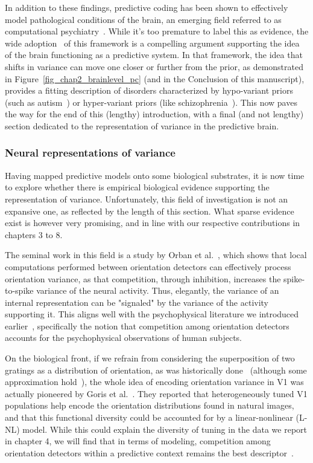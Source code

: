 In addition to these findings, predictive coding has been shown to effectively model pathological conditions of the brain, an emerging field referred to as computational psychiatry~\cite{adams2013computational}.  While it's too premature to label this as evidence, the wide adoption~\cite{grenander1998computational} of this framework is a compelling argument supporting the idea of the brain functioning as a predictive system. In that framework, the idea that shifts in variance can move one closer or further from the prior, as demonstrated in Figure~\ref{fig_chap2_brainlevel_pc} (and in the Conclusion of this manuscript), provides a fitting description of disorders characterized by hypo-variant priors (such as autism~\cite{van2013predictive, van2014precise}) or hyper-variant priors (like schizophrenia~\cite{horga2014deficits}). This now paves the way for the end of this (lengthy) introduction, with a final (and not lengthy) section dedicated to the representation of variance in the predictive brain.

\newpage

\subsubsection{Neural representations of variance}
Having mapped predictive models onto some biological substrates, it is now time to explore whether there is empirical biological evidence supporting the representation of variance. Unfortunately, this field of investigation is not an expansive one, as reflected by the length of this section. What sparse evidence exist is however very promising, and in line with our respective contributions in chapters 3 to 8.

The seminal work in this field is a study by Orban et al.~\cite{orban2016neural}, which shows that local computations performed between orientation detectors can effectively process orientation variance, as that competition, through inhibition, increases the spike-to-spike variance of the neural activity. Thus, elegantly, the variance of an internal representation can be "signaled" by the variance of the activity supporting it. This aligns well with the psychophysical literature we introduced earlier~\cite{heeley1989width}, specifically the notion that competition among orientation detectors accounts for the psychophysical observations of human subjects. 

On the biological front, if we refrain from considering the superposition of two gratings as a distribution of orientation, as was historically done~\cite{geisler2001motion} (although some approximation hold~\cite{furmanski2000oblique,li2003oblique}), the whole idea of encoding orientation variance in \gls{V1} was actually pioneered by Goris et al.~\cite{goris2015origin}. They reported that heterogeneously tuned \gls{V1} populations help encode the orientation distributions found in natural images, and that this functional diversity could be accounted for by a linear-nonlinear (L-NL) model. While this could explain the diversity of tuning in the data we report in chapter 4, we will find that in terms of modeling, competition among orientation detectors within a predictive context remains the best descriptor~\cite{ladret2023cortical}. 

